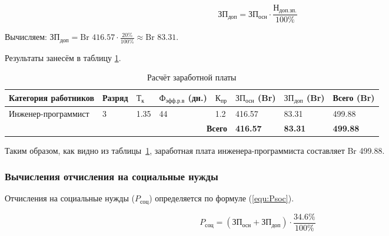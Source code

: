\begin{equation}
    \label{equ:ZPdop}
    \text{ЗП}_\text{доп} = \text{ЗП}_\text{осн} \cdot \frac{ \text{Н}_\text{доп.зп.} }{ 100\% }
\end{equation}

Вычисляем: $\text{ЗП}_\text{доп} = \text{Br }416.57 \cdot \frac{ 20\% }{ 100\% } \approx \text{Br } 83.31$.

Результаты занесём в таблицу \ref{tab:ZPRezult}.

\begin{table}[ht]
    \centering

    \caption{Расчёт заработной платы}
    \label{tab:ZPRezult}

    \begin{tabular}{|p{3cm}|p{1.7cm}|p{1cm}|p{2cm}|p{1cm}|p{1.5cm}|p{1.5cm}|p{1.5cm}|}
        \hline
        \textbf{Категория работников}
        & \textbf{Разряд}
        & \textbf{$\text{Т}_\text{к}$}
        & \textbf{$\text{Ф}_\text{эфф.р.в}$} \textbf{(дн.)}
        & \textbf{$\text{К}_\text{пр}$}
        & \textbf{$\text{ЗП}_\text{осн}$} \textbf{(Br)}
        & \textbf{$\text{ЗП}_\text{доп}$} \textbf{(Br)}
        & \textbf{Всего} \textbf{(Br)}
        \\ \hline

        Инженер-программист
        & 3
        & 1.35
        & 44
        & 1.2
        & 416.57
        & 83.31
        & 499.88
        \\ \hline

        \multicolumn{5}{|r|}{\textbf{Всего}}
        & \textbf{416.57}
        & \textbf{83.31}
        & \textbf{499.88}
        \\ \hline
    \end{tabular}
\end{table}

Таким образом, как видно из таблицы~\ref{tab:ZPRezult}, заработная плата инженера-программиста составляет Br 499.88.

\subsubsection*{Вычисления отчисления на социальные нужды}

Отчисления на социальные нужды ($P_\text{соц}$) определяется по формуле (\ref{equ:Psoc}).

\begin{equation}
    \label{equ:Psoc}
    P_\text{соц} = (\text{ЗП}_\text{осн} + \text{ЗП}_\text{доп}) \cdot \frac{ 34.6\% }{ 100\% }
\end{equation}

